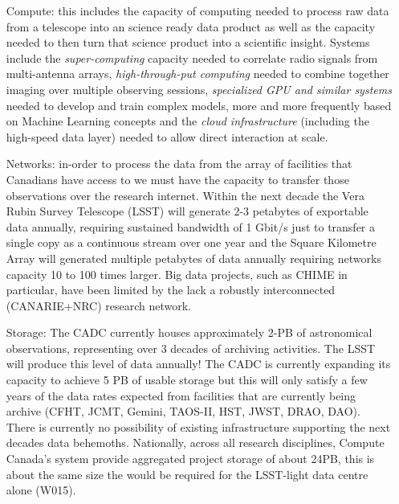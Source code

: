 \documentclass[11pt]{article}
\begin{document}
\begin{itemize}
    \item[Compute:] this includes the capacity of computing needed to process raw data from a telescope into an science ready data product as well as the capacity needed to then turn that science product into a scientific insight.  Systems include the {\it super-computing} capacity needed to correlate radio signals from multi-antenna arrays, {\it high-through-put computing} needed to combine together imaging over multiple observing sessions, {\it specialized GPU and similar systems} needed to develop and train complex models, more and more frequently based on Machine Learning concepts and the {\it cloud infrastructure} (including the high-speed data layer) needed to allow direct interaction at scale.
    \item[Networks:] in-order to process the data from the array of facilities that Canadians have access to we must have the capacity to transfer those observations over the research internet.  Within the next decade the Vera Rubin Survey Telescope (LSST) will generate 2-3 petabytes of exportable data annually, requiring sustained bandwidth of 1 Gbit/s just to transfer a single copy as a continuous stream over one year and the Square Kilometre Array will generated multiple petabytes of data annually requiring networks capacity 10 to 100 times larger.  Big data projects, such as CHIME in particular, have been limited by the lack a robustly interconnected (CANARIE+NRC) research network.
    \item[Storage:] The CADC currently houses approximately 2-PB of astronomical observations, representing over 3 decades of archiving activities.  The LSST will produce this level of data annually!  The CADC is currently expanding its capacity to achieve 5 PB of usable storage but  this will only satisfy a few years of the data rates expected from facilities that are currently being archive (CFHT, JCMT, Gemini, TAOS-II, HST, JWST, DRAO, DAO).  There is currently no possibility of existing infrastructure supporting the next decades data behemoths.   Nationally, across all research disciplines, Compute Canada's system provide aggregated project storage of about 24PB, this is about the same size the would be required for the LSST-light data centre alone (W015).

\end{itemize}
\end{document}
